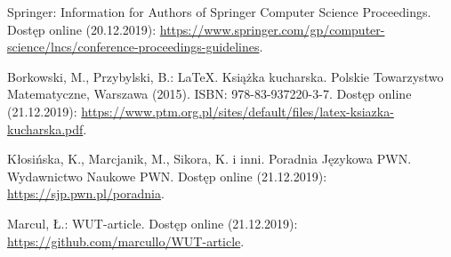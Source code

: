 Springer: Information for Authors of Springer Computer Science Proceedings. Dostęp online (20.12.2019):
\url{https://www.springer.com/gp/computer-science/lncs/conference-proceedings-guidelines}.

Borkowski, M., Przybylski, B.: \LaTeX. Książka kucharska. Polskie Towarzystwo Matematyczne, Warszawa (2015). ISBN: 978-83-937220-3-7. Dostęp online (21.12.2019):
\url{https://www.ptm.org.pl/sites/default/files/latex-ksiazka-kucharska.pdf}.

Kłosińska, K., Marcjanik, M., Sikora, K. i inni. Poradnia Językowa PWN. Wydawnictwo Naukowe PWN. Dostęp online (21.12.2019):
\url{https://sjp.pwn.pl/poradnia}.

Marcul, Ł.: WUT-article. Dostęp online (21.12.2019):\\
\url{https://github.com/marcullo/WUT-article}.

